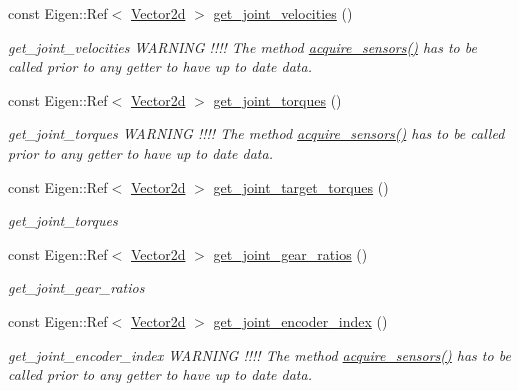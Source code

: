 \begin{DoxyCompactItemize}
const Eigen\+::\+Ref$<$ \hyperlink{common__header_8hpp_acb6916bc8c9fe9d98c484fd4cc201447}{Vector2d} $>$ \hyperlink{classblmc__robots_1_1Teststand_acd1b325c6039fffbd40198f6deb9542c}{get\+\_\+joint\+\_\+velocities} ()
\begin{DoxyCompactList}\small\item\em get\+\_\+joint\+\_\+velocities W\+A\+R\+N\+I\+NG !!!! The method \hyperlink{classblmc__robots_1_1Teststand_a4203e25148ab5b4ddfef3b46647213c6}{acquire\+\_\+sensors()} has to be called prior to any getter to have up to date data. \end{DoxyCompactList}\item 
const Eigen\+::\+Ref$<$ \hyperlink{common__header_8hpp_acb6916bc8c9fe9d98c484fd4cc201447}{Vector2d} $>$ \hyperlink{classblmc__robots_1_1Teststand_ae21ac86534e5ee7f15068f94957ba826}{get\+\_\+joint\+\_\+torques} ()
\begin{DoxyCompactList}\small\item\em get\+\_\+joint\+\_\+torques W\+A\+R\+N\+I\+NG !!!! The method \hyperlink{classblmc__robots_1_1Teststand_a4203e25148ab5b4ddfef3b46647213c6}{acquire\+\_\+sensors()} has to be called prior to any getter to have up to date data. \end{DoxyCompactList}\item 
const Eigen\+::\+Ref$<$ \hyperlink{common__header_8hpp_acb6916bc8c9fe9d98c484fd4cc201447}{Vector2d} $>$ \hyperlink{classblmc__robots_1_1Teststand_a0aa762511624791e4ccbec5ad664371f}{get\+\_\+joint\+\_\+target\+\_\+torques} ()
\begin{DoxyCompactList}\small\item\em get\+\_\+joint\+\_\+torques \end{DoxyCompactList}\item 
const Eigen\+::\+Ref$<$ \hyperlink{common__header_8hpp_acb6916bc8c9fe9d98c484fd4cc201447}{Vector2d} $>$ \hyperlink{classblmc__robots_1_1Teststand_a7def64b82a1cb58c9ae8c9c54bcaa887}{get\+\_\+joint\+\_\+gear\+\_\+ratios} ()
\begin{DoxyCompactList}\small\item\em get\+\_\+joint\+\_\+gear\+\_\+ratios \end{DoxyCompactList}\item 
const Eigen\+::\+Ref$<$ \hyperlink{common__header_8hpp_acb6916bc8c9fe9d98c484fd4cc201447}{Vector2d} $>$ \hyperlink{classblmc__robots_1_1Teststand_a2fa7aacb213c7898bb04f791ca3687d1}{get\+\_\+joint\+\_\+encoder\+\_\+index} ()
\begin{DoxyCompactList}\small\item\em get\+\_\+joint\+\_\+encoder\+\_\+index W\+A\+R\+N\+I\+NG !!!! The method \hyperlink{classblmc__robots_1_1Teststand_a4203e25148ab5b4ddfef3b46647213c6}{acquire\+\_\+sensors()} has to be called prior to any getter to have up to date data. \end{DoxyCompactList}\item 

\end{DoxyCompactItemize}
